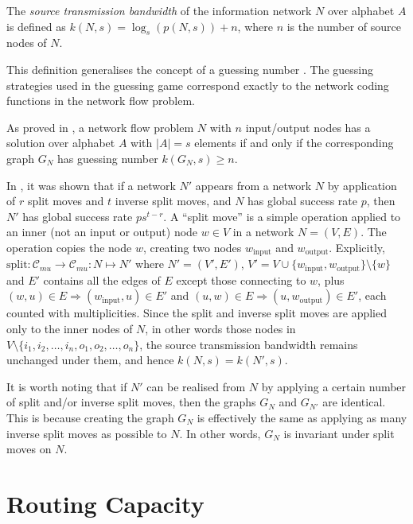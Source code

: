 \begin{definition}

The \emph{source transmission bandwidth} of the information network $N$ over alphabet $A$ is defined as $k(N, s) = \log_s(p(N, s)) + n$, where $n$ is the number of source nodes of $N$.

\end{definition}
This definition generalises the concept of a guessing number \cite{riis2005util}. The guessing strategies used in the guessing game correspond exactly to the network coding functions in the network flow problem.

As proved in \cite{riis2005info}, a network flow problem $N$ with $n$ input/output nodes has a solution over alphabet $A$ with $|A| = s$ elements if and only if the corresponding graph $G_N$ has guessing number $k(G_N, s) \geq n$.

In \cite{riis2005util}, it was shown that if a network $N'$ appears from a network $N$ by application of $r$ split moves and $t$ inverse split moves, and $N$ has global success rate $p$, then $N'$ has global success rate $ps^{t - r}$. A ``split move'' is a simple operation applied to an inner (not an input or output) node $w \in V$ in a network $N = (V, E)$. The operation copies the node $w$, creating two nodes $w_{\mathrm{input}}$ and $w_{\mathrm{output}}$. Explicitly, $\mathrm{split} : \mathcal{C}_{mu} \rightarrow \mathcal{C}_{mu} : N \mapsto N'$ where $N' = (V', E')$, $V' = V \cup \{ w_{\mathrm{input}}, w_{\mathrm{output}} \} \setminus \{ w \}$ and $E'$ contains all the edges of $E$ except those connecting to $w$, plus $(w, u) \in E \Rightarrow (w_{\mathrm{input}}, u) \in E'$ and $(u, w) \in E \Rightarrow (u, w_{\mathrm{output}}) \in E'$, each counted with multiplicities. Since the split and inverse split moves are applied only to the inner nodes of $N$, in other words those nodes in $V \setminus \{i_1, i_2, \dots, i_n, o_1, o_2, \dots, o_n \}$, the source transmission bandwidth remains unchanged under them, and hence $k(N, s) = k(N', s)$.

It is worth noting that if $N'$ can be realised from $N$ by applying a certain number of split and/or inverse split moves, then the graphs $G_N$ and $G_{N'}$ are identical. This is because creating the graph $G_N$ is effectively the same as applying as many inverse split moves as possible to $N$. In other words, $G_N$ is invariant under split moves on $N$.

\section{Routing Capacity}
\label{sect:routing_capacity}

